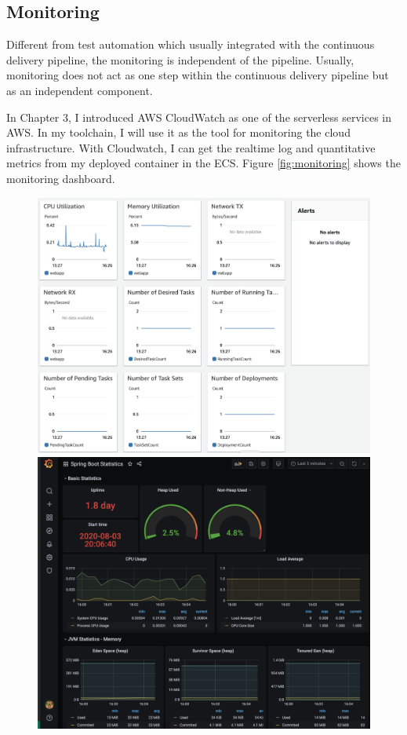 \subsection{Monitoring}
Different from test automation which usually integrated with the continuous delivery pipeline, the monitoring is independent of the pipeline. Usually, monitoring does not act as one step within the continuous delivery pipeline but as an independent component.
\par
In Chapter 3, I introduced AWS CloudWatch as one of the serverless services in AWS. In my toolchain, I will use it as the tool for monitoring the cloud infrastructure. With Cloudwatch, I can get the realtime log and  quantitative metrics from my deployed container in the ECS. Figure \ref{fig:monitoring} shows the monitoring dashboard.
\begin{figure}[!tbp]
     \centering
     \begin{minipage}[b]{0.47\textwidth}
       \includegraphics[width=\textwidth]{pics/monitoring.png}
     \end{minipage}
     \hfill
     \begin{minipage}[b]{0.50\textwidth}
       \includegraphics[width=\textwidth]{pics/grafana.png}

\end{minipage}
\end{figure}
